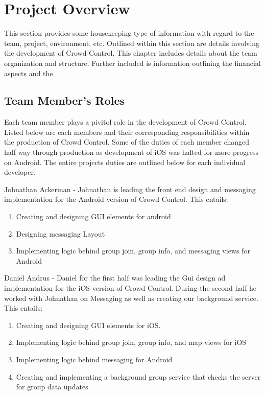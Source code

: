 

\chapter{Project Overview}
This section provides some housekeeping type of information with regard to the 
team, project, environment, etc.
Outlined within this section are details involving the development of Crowd Control.  This chapter includes details about the team organization and structure.  Further included is information outlining the financial aspects and the 



\section{Team Member's Roles}
Each team member plays a pivitol role in the development of Crowd Control.  Listed below are each members and their corresponding responsibilities within the production of Crowd Control.  Some of the duties of each member changed half way through production as development of iOS was halted for more progress on Android.  The entire projects duties are outlined below for each individual developer.  

Johnathan Ackerman - Johnathan is leading the front end design and messaging implementation for the Android version of Crowd Control. This entails: 
	\begin {enumerate}
	\item Creating and designing GUI elements for android
	\item Designing messaging Layout
	\item Implementing logic behind group join, group info, and messaging views for Android
	\end{enumerate}

Daniel Andrus - Daniel for the first half was leading the Gui design ad implementation for the iOS version of Crowd Control.  During the second half he worked with Johnathan on Messaging as well as creating our background service. This entails:
	\begin {enumerate}
	\item Creating and designing GUI elements for iOS.
	\item Implementing logic behind group join, group info, and map views for iOS
	\item Implementing logic behind messaging for Android
	\item Creating and implementing a background group service that checks the server for group data updates
	\end{enumerate}

